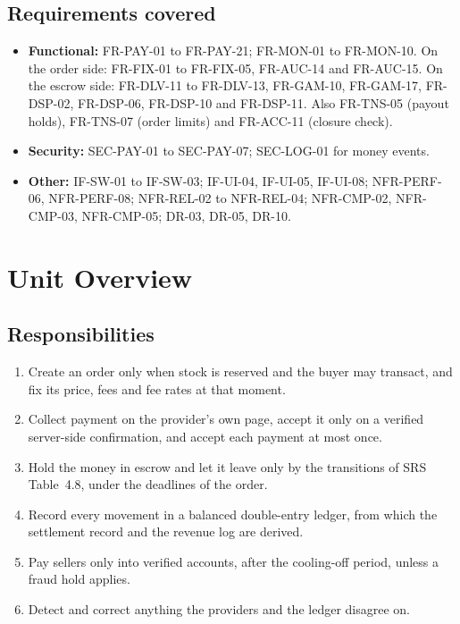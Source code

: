 \documentclass[11pt,a4paper]{article}
\begin{document}
\subsection{Requirements covered}
\begin{itemize}[nosep]
  \item \textbf{Functional:} FR-PAY-01 to FR-PAY-21; FR-MON-01 to FR-MON-10. On the order side: FR-FIX-01 to FR-FIX-05, FR-AUC-14 and FR-AUC-15. On the escrow side: FR-DLV-11 to FR-DLV-13, FR-GAM-10, FR-GAM-17, FR-DSP-02, FR-DSP-06, FR-DSP-10 and FR-DSP-11. Also FR-TNS-05 (payout holds), FR-TNS-07 (order limits) and FR-ACC-11 (closure check).
  \item \textbf{Security:} SEC-PAY-01 to SEC-PAY-07; SEC-LOG-01 for money events.
  \item \textbf{Other:} IF-SW-01 to IF-SW-03; IF-UI-04, IF-UI-05, IF-UI-08; NFR-PERF-06, NFR-PERF-08; NFR-REL-02 to NFR-REL-04; NFR-CMP-02, NFR-CMP-03, NFR-CMP-05; DR-03, DR-05, DR-10.
\end{itemize}

\section{Unit Overview}

\subsection{Responsibilities}
\begin{enumerate}[nosep]
  \item Create an order only when stock is reserved and the buyer may transact, and fix its price, fees and fee rates at that moment.
  \item Collect payment on the provider's own page, accept it only on a verified server-side confirmation, and accept each payment at most once.
  \item Hold the money in escrow and let it leave only by the transitions of SRS Table~4.8, under the deadlines of the order.
  \item Record every movement in a balanced double-entry ledger, from which the settlement record and the revenue log are derived.
  \item Pay sellers only into verified accounts, after the cooling-off period, unless a fraud hold applies.
  \item Detect and correct anything the providers and the ledger disagree on.
\end{enumerate}
\end{document}
